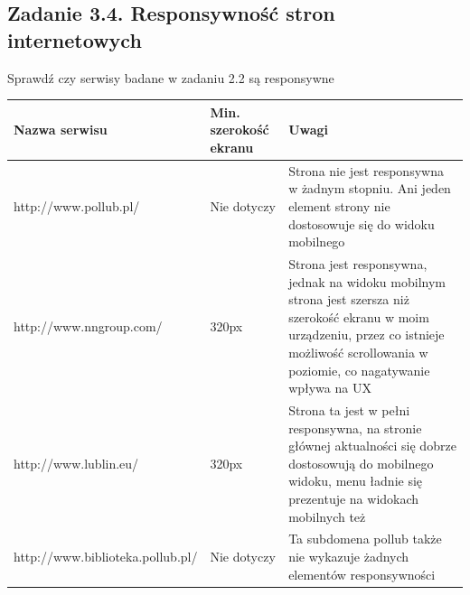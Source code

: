 \documentclass[12pt]{article}
\begin{document}
    \subsection{Zadanie 3.4. Responsywność stron internetowych}

    Sprawdź czy serwisy badane w zadaniu 2.2 są responsywne

    \begin{longtable}{|p{}|p{}|p{}|}
        \textbf{Nazwa serwisu} & \textbf{Min. szerokość ekranu} & \textbf{Uwagi}\\
        \hline
        http://www.pollub.pl/ & Nie dotyczy & Strona nie jest responsywna w żadnym stopniu. Ani jeden element strony nie dostosowuje się do widoku mobilnego\\
        \hline
        http://www.nngroup.com/ & 320px &Strona jest responsywna, jednak na widoku mobilnym strona jest szersza niż szerokość ekranu w moim urządzeniu, przez co istnieje możliwość scrollowania w poziomie, co nagatywanie wpływa na UX\\
        \hline
        http://www.lublin.eu/ & 320px & Strona ta jest w pełni responsywna, na stronie głównej aktualności się dobrze dostosowują do mobilnego widoku, menu ładnie się prezentuje na widokach mobilnych też\\
        \hline
        http://www.biblioteka.pollub.pl/ & Nie dotyczy & Ta subdomena pollub także nie wykazuje żadnych elementów responsywności\\
        \hline
    \end{longtable}
\end{document}
